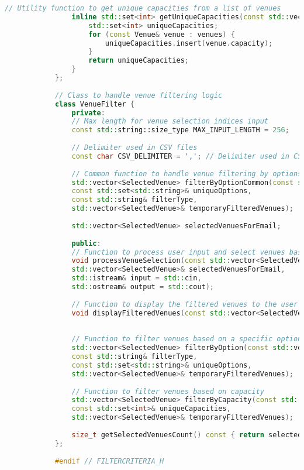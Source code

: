 \documentclass{article}
\begin{document}
\begin{mdframed}[backgroundcolor=background, hidealllines=false, innerleftmargin=15pt, innerrightmargin=5pt, innertopmargin=0pt, innerbottommargin=-5pt, linecolor=accent]
\begin{lstlisting}[language=C++]
				// Utility function to get unique capacities from a list of venues
				inline std::set<int> getUniqueCapacities(const std::vector<Venue>& venues) {
					std::set<int> uniqueCapacities;
					for (const Venue& venue : venues) {
						uniqueCapacities.insert(venue.capacity);
					}
					return uniqueCapacities;
				}
			};
			
			// Class to handle venue filtering logic
			class VenueFilter {
				private:
				// Max length for venue selection indices input
				const std::string::size_type MAX_INPUT_LENGTH = 256;
				
				// Delimiter used in CSV files
				const char CSV_DELIMITER = ','; // Delimiter used in CSV files
				
				// Common function to handle venue filtering by options like Genre, State, City
				std::vector<SelectedVenue> filterByOptionCommon(const std::vector<Venue>& venues,
				const std::set<std::string>& uniqueOptions,
				const std::string& filterType,
				std::vector<SelectedVenue>& temporaryFilteredVenues);
				
				std::vector<SelectedVenue> selectedVenuesForEmail;
				
				public:
				// Function to process user input and select venues based on it
				void processVenueSelection(const std::vector<SelectedVenue>& temporaryFilteredVenues,
				std::vector<SelectedVenue>& selectedVenuesForEmail,
				std::istream& input = std::cin,
				std::ostream& output = std::cout);
				
				// Function to display the filtered venues to the user
				void displayFilteredVenues(const std::vector<SelectedVenue>& selectedVenuesForDisplay);
				
				
				// Function to filter venues based on a specific option (Genre, State, etc.)
				std::vector<SelectedVenue> filterByOption(const std::vector<Venue>& venues,
				const std::string& filterType,
				const std::set<std::string>& uniqueOptions,
				std::vector<SelectedVenue>& temporaryFilteredVenues);
				
				// Function to filter venues based on capacity
				std::vector<SelectedVenue> filterByCapacity(const std::vector<Venue>& venues,
				const std::set<int>& uniqueCapacities,
				std::vector<SelectedVenue>& temporaryFilteredVenues);
				
				size_t getSelectedVenuesCount() const { return selectedVenuesForEmail.size(); }
			};
			
			#endif // FILTERCRITERIA_H
		\end{lstlisting}
	\end{mdframed}
	
\end{document}
